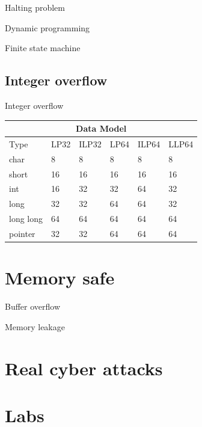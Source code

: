 \documentclass{beamer}
\begin{document}
\begin{CJK*}{UTF8}{bsmi}
    \begin{frame}{Halting problem}

    \end{frame}

    \begin{frame}{Dynamic programming}

    \end{frame}

    \begin{frame}{Finite state machine}

    \end{frame}

    \subsection{Integer overflow}
    \begin{frame}{Integer overflow}
        \centering
        \begin{tabular}{ |p{2cm}||p{1cm}|p{1cm}|p{1cm}|p{1cm}|p{1cm}|  }
            \hline
            \multicolumn{6}{|c|}{Data Model}                \\
            \hline
            Type      & LP32 & ILP32 & LP64 & ILP64 & LLP64 \\
            \hline
            char      & 8    & 8     & 8    & 8     & 8     \\
            short     & 16   & 16    & 16   & 16    & 16    \\
            int       & 16   & 32    & 32   & 64    & 32    \\
            long      & 32   & 32    & 64   & 64    & 32    \\
            long long & 64   & 64    & 64   & 64    & 64    \\
            pointer   & 32   & 32    & 64   & 64    & 64    \\
            \hline
        \end{tabular}
    \end{frame}

    \section{Memory safe}
    \begin{frame}{Buffer overflow}

    \end{frame}

    \begin{frame}{Memory leakage}

    \end{frame}



    \section{Real cyber attacks}


    \section{Labs}


\end{CJK*}
\end{document}
